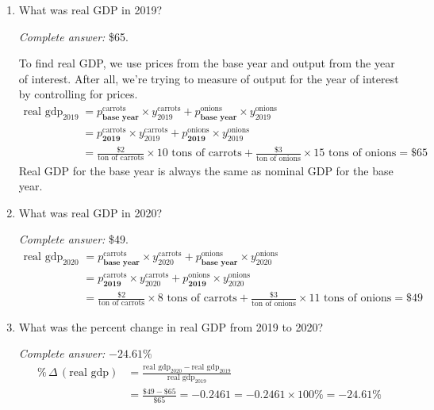 \documentclass{assignment}
\begin{document}
\begin{enumerate}
\begin{enumerate}

\item What was real GDP in 2019?

\begin{solution}
\emph{Complete answer:} \$65.

To find real GDP, we use prices from the base year and output from the year of interest. After all, we're trying to measure of output for the year of interest by controlling for prices.
\begin{align*}
\text{real gdp}_{\text{2019}} &= 
p^{\text{carrots}}_{\textbf{base year}} \times y^{\text{carrots}}_{\text{2019}} +
p^{\text{onions}}_{\textbf{base year}} \times y^{\text{onions}}_{\text{2019}} \\
 &= 
p^{\text{carrots}}_{\textbf{2019}} \times y^{\text{carrots}}_{\text{2019}} +
p^{\text{onions}}_{\textbf{2019}} \times y^{\text{onions}}_{\text{2019}} \\
 &= \frac{\$2}{\text{ton of carrots}} \times 10 \text{ tons of carrots} + \frac{\$3}{\text{ton of onions}} \times 15 \text{ tons of onions} = \$65
\end{align*}
Real GDP for the base year is always the same as nominal GDP for the base year.
\end{solution}

\item What was real GDP in 2020?

\begin{solution}
\emph{Complete answer:} \$49.
\begin{align*}
\text{real gdp}_{\text{2020}} &= 
p^{\text{carrots}}_{\textbf{base year}} \times y^{\text{carrots}}_{\text{2020}} +
p^{\text{onions}}_{\textbf{base year}} \times y^{\text{onions}}_{\text{2020}} \\
 &= 
p^{\text{carrots}}_{\textbf{2019}} \times y^{\text{carrots}}_{\text{2020}} +
p^{\text{onions}}_{\textbf{2019}} \times y^{\text{onions}}_{\text{2020}} \\
 &= \frac{\$2}{\text{ton of carrots}} \times 8 \text{ tons of carrots} + \frac{\$3}{\text{ton of onions}} \times 11 \text{ tons of onions} = \$49
\end{align*}
\end{solution}

\item What was the percent change in real GDP from 2019 to 2020?

\begin{solution}
\emph{Complete answer:} $-24.61\%$
\begin{align*}
\%\,\Delta\,(\text{real gdp}) &= \frac{\text{real gdp}_{\text{2020}} - \text{real gdp}_{\text{2019}}}{\text{real gdp}_{\text{2019}}} \\
&= \frac{\$49 - \$65}{\$65} = -0.2461 = -0.2461 \times 100\% = -24.61\%
\end{align*}
\end{solution}


\end{enumerate}
\end{enumerate}
\end{document}
